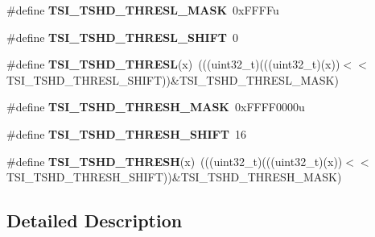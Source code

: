 \begin{DoxyCompactItemize}
\#define {\bfseries T\+S\+I\+\_\+\+T\+S\+H\+D\+\_\+\+T\+H\+R\+E\+S\+L\+\_\+\+M\+A\+SK}~0x\+F\+F\+F\+Fu
\item 
\mbox{\label{group___t_s_i___register___masks_ga18eac1ce2de17bfde158e5047b4a9e0e}} 
\#define {\bfseries T\+S\+I\+\_\+\+T\+S\+H\+D\+\_\+\+T\+H\+R\+E\+S\+L\+\_\+\+S\+H\+I\+FT}~0
\item 
\mbox{\label{group___t_s_i___register___masks_gadeef11bfa64314e7382e1cfeaaad7ee4}} 
\#define {\bfseries T\+S\+I\+\_\+\+T\+S\+H\+D\+\_\+\+T\+H\+R\+E\+SL}(x)~(((uint32\+\_\+t)(((uint32\+\_\+t)(x))$<$$<$T\+S\+I\+\_\+\+T\+S\+H\+D\+\_\+\+T\+H\+R\+E\+S\+L\+\_\+\+S\+H\+I\+FT))\&T\+S\+I\+\_\+\+T\+S\+H\+D\+\_\+\+T\+H\+R\+E\+S\+L\+\_\+\+M\+A\+SK)
\item 
\mbox{\label{group___t_s_i___register___masks_ga0600b952fc2faf25682e507b91ce4a15}} 
\#define {\bfseries T\+S\+I\+\_\+\+T\+S\+H\+D\+\_\+\+T\+H\+R\+E\+S\+H\+\_\+\+M\+A\+SK}~0x\+F\+F\+F\+F0000u
\item 
\mbox{\label{group___t_s_i___register___masks_gaf35f3c8f797b62c3b5dba24c5035255a}} 
\#define {\bfseries T\+S\+I\+\_\+\+T\+S\+H\+D\+\_\+\+T\+H\+R\+E\+S\+H\+\_\+\+S\+H\+I\+FT}~16
\item 
\mbox{\label{group___t_s_i___register___masks_ga203450ceffe74f78f3669057eb1898a5}} 
\#define {\bfseries T\+S\+I\+\_\+\+T\+S\+H\+D\+\_\+\+T\+H\+R\+E\+SH}(x)~(((uint32\+\_\+t)(((uint32\+\_\+t)(x))$<$$<$T\+S\+I\+\_\+\+T\+S\+H\+D\+\_\+\+T\+H\+R\+E\+S\+H\+\_\+\+S\+H\+I\+FT))\&T\+S\+I\+\_\+\+T\+S\+H\+D\+\_\+\+T\+H\+R\+E\+S\+H\+\_\+\+M\+A\+SK)
\end{DoxyCompactItemize}


\subsection{Detailed Description}
